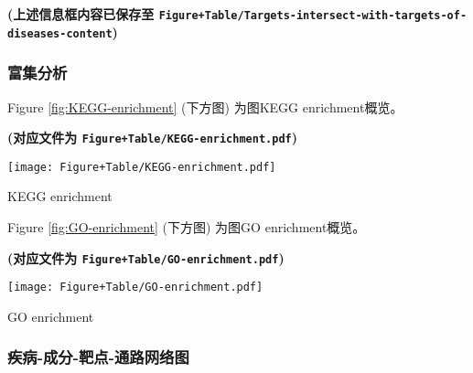 \documentclass[
]{article}
\begin{document}
\textbf{(上述信息框内容已保存至 \texttt{Figure+Table/Targets-intersect-with-targets-of-diseases-content})}

\hypertarget{ux5bccux96c6ux5206ux6790}{%
\subsubsection{富集分析}\label{ux5bccux96c6ux5206ux6790}}

\begin{center}\vspace{1.5cm}\end{center}

Figure \ref{fig:KEGG-enrichment} (下方图) 为图KEGG enrichment概览。

\textbf{(对应文件为 \texttt{Figure+Table/KEGG-enrichment.pdf})}

\def\@captype{figure}
\begin{center}
\texttt{[image: Figure+Table/KEGG-enrichment.pdf]}
\caption{KEGG enrichment}\label{fig:KEGG-enrichment}
\end{center}

\begin{center}\vspace{1.5cm}\end{center}

\begin{center}\vspace{1.5cm}\end{center}

Figure \ref{fig:GO-enrichment} (下方图) 为图GO enrichment概览。

\textbf{(对应文件为 \texttt{Figure+Table/GO-enrichment.pdf})}

\def\@captype{figure}
\begin{center}
\texttt{[image: Figure+Table/GO-enrichment.pdf]}
\caption{GO enrichment}\label{fig:GO-enrichment}
\end{center}

\begin{center}\vspace{1.5cm}\end{center}

\hypertarget{ux75beux75c5-ux6210ux5206-ux9776ux70b9-ux901aux8defux7f51ux7edcux56fe}{%
\subsubsection{疾病-成分-靶点-通路网络图}\label{ux75beux75c5-ux6210ux5206-ux9776ux70b9-ux901aux8defux7f51ux7edcux56fe}}
\end{document}
